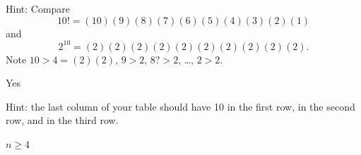 \subsubsection*{ \answers}
\begin{apart}
    \item Hint: Compare 
        $$10!=(10)(9)(8)(7)(6)(5)(4)(3)(2)(1)$$
    and 
        $$2^{10} = (2)(2)(2)(2)(2)(2)(2)(2)(2)(2).$$
    Note $10>4 = (2)(2)$, $9>2$, $8?>2$, \ldots, $2>2$.  
    \item Yes
    \item Hint: the last column of your table should have 10 in the first row,  in the second row, and  in the third row.
    \item $n \ge 4$
\end{apart}



